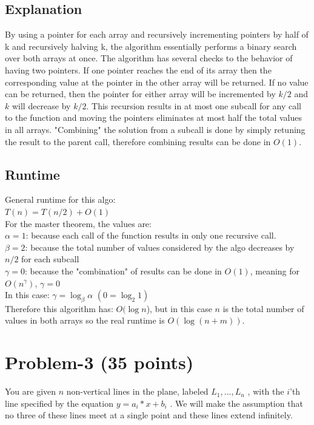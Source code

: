 \documentclass[11pt]{article}
\begin{document}
\subsection*{Explanation}
By using a pointer for each array and recursively incrementing pointers by half of k and recursively halving k, the algorithm essentially performs a binary search over both arrays at once. The algorithm has several checks to the behavior of having two pointers. If one pointer reaches the end of its array then the corresponding value at the pointer in the other array will be returned. If no value can be returned, then the pointer for either array will be incremented by $k/2$ and $k$ will decrease by $k/2$. This recursion results in at most one subcall for any call to the function and moving the pointers eliminates at most half the total values in all arrays. "Combining" the solution from a subcall is done by simply retuning the result to the parent call, therefore combining results can be done in $O(1)$.

\subsection*{Runtime}
General runtime for this algo:\\
$T(n) = T(n/2) + O(1)$\\

\noindent For the master theorem, the values are:\\
\noindent $\alpha=1$: because each call of the function results in only one recursive call.\\
$\beta=2$: because the total number of values considered by the algo decreases by $n/2$ for each subcall\\
$\gamma=0$: because the "combination" of results can be done in $O(1)$, meaning for $O(n^\gamma)$, $\gamma = 0$\\

\noindent In this case: $\gamma = \log_\beta \alpha$ $(0 = \log_2 1)$\\
Therefore this algorithm has: $O(\log n$), but in this case $n$ is the total number of values in both arrays so the real runtime is $O(\log(n+m))$.


\newpage
\section*{Problem-3 (35 points)}
You are given $n$ non-vertical lines in the plane, labeled $L_1, ..., L_n$ , with the $i$'th line specified by the equation $y = a_i*x + b_i$ . We will make the assumption that no three of these lines  meet at a single point and these lines extend infinitely. 
\end{document}
